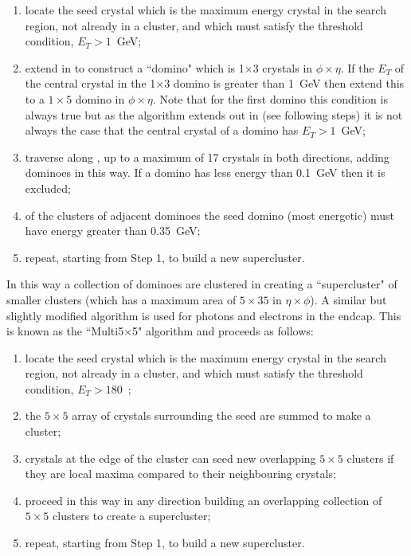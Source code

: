 \begin{enumerate}
  \item{locate the seed crystal which is the maximum energy crystal in the search region, not already in a cluster, and which must satisfy the threshold condition, $E_{T}>1$~GeV;}
  \item{extend in \eta to construct a ``domino" which is 1$\times$3 crystals in $\phi\times\eta$. If the $E_{T}$ of the central crystal in the 1$\times$3 domino is greater than 1~GeV then extend this to a $1\times5$ domino in $\phi\times\eta$. Note that for the first domino this condition is always true but as the algorithm extends out in \phi (see following steps) it is not always the case that the central crystal of a domino has $E_{T}>1$~GeV;}
  \item{traverse along \phi, up to a maximum of 17 crystals in both directions, adding dominoes in this way. If a domino has less energy than 0.1~GeV then it is excluded;}
  \item{of the clusters of adjacent dominoes the seed domino (most energetic) must have energy greater than 0.35~GeV;}
  \item{repeat, starting from Step 1, to build a new supercluster.}
\end{enumerate}
In this way a collection of dominoes are clustered in \phi creating a ``supercluster" of smaller clusters (which has a maximum area of $5\times35$ in $\eta\times\phi$). A similar but slightly modified algorithm is used for photons and electrons in the endcap. This is known as the ``Multi5$\times$5" algorithm and proceeds as follows:

\begin{enumerate}
  \item{locate the seed crystal which is the maximum energy crystal in the search region, not already in a cluster, and which must satisfy the threshold condition, $E_{T}>180$~\MeV;}
  \item{the $5\times5$ array of crystals surrounding the seed are summed to make a cluster;}
  \item{crystals at the edge of the cluster can seed new overlapping $5\times5$ clusters if they are local maxima compared to their neighbouring crystals;}
  \item{proceed in this way in any direction building an overlapping collection of $5\times5$ clusters to create a supercluster;}
  \item{repeat, starting from Step 1, to build a new supercluster.}
\end{enumerate}

